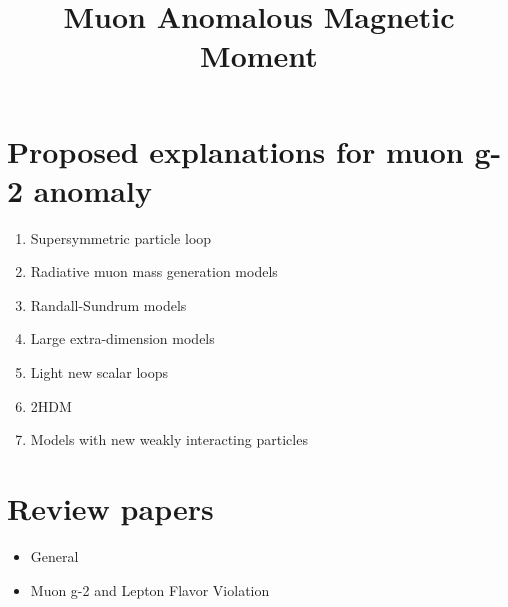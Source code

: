 \documentclass[12pt, letterpaper]{article}
\title{Muon Anomalous Magnetic Moment}
\date{}
\begin{document}
\maketitle

\section*{Proposed explanations for muon g-2 anomaly}

\begin{enumerate}
\item Supersymmetric particle loop ~\cite{Czarnecki:2001pv}
\item Radiative muon mass generation models ~\cite{Czarnecki:2001pv,Borzumati:1999sp,Crivellin:2010ty}
\item Randall-Sundrum models ~\cite{Davoudiasl:2000my,Kim:2001rc,Park:2001xp}
\item Large extra-dimension models ~\cite{Graesser:1999yg}
\item Light new scalar loops ~\cite{Chen:2015vqy,Batell:2016ove,Marciano:2016yhf,Liu:2018xkx}
\item 2HDM ~\cite{Cherchiglia:2017uwv,Jana:2020pxx,Botella:2020xzf,Li:2020dbg}
\item Models with new weakly interacting particles ~\cite{Appelquist:2001jz,Blanke:2007db,DiChiara:2017cjq}
\end{enumerate}

\section*{Review papers}
\begin{itemize}
\item General ~\cite{Czarnecki:2001pv,Jegerlehner:2009ry,Miller:2012opa}
\item Muon g-2 and Lepton Flavor Violation ~\cite{Lindner:2016bgg}
\end{itemize}




\end{document}
